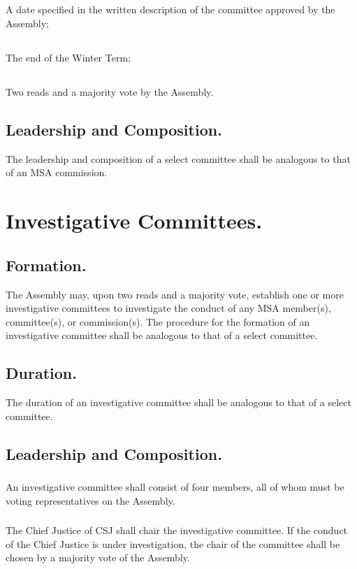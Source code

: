 \documentclass{rules}
\begin{document}
\subsection{}
A date specified in the written description of the committee approved by the Assembly;
\subsection{}
The end of the Winter Term; 
\subsection{}
Two reads and a majority vote by the Assembly.
\subsection{Leadership and Composition.}
The leadership and composition of a select committee shall be analogous to that of an MSA commission.  

\section{Investigative Committees.}
\subsection{Formation.}
The Assembly may, upon two reads and a majority vote, establish one or more investigative committees to investigate the conduct of any MSA member(s), committee(s), or commission(s).  The procedure for the formation of an investigative committee shall be analogous to that of a select committee.
\subsection{Duration.}
The duration of an investigative committee shall be analogous to that of a select committee.
\subsection{Leadership and Composition.}
\subsubsection{}
An investigative committee shall consist of four members, all of whom must be voting representatives on the Assembly.  
\subsubsection{}
The Chief Justice of CSJ shall chair the investigative committee.  If the conduct of the Chief Justice is under investigation, the chair of the committee shall be chosen by a majority vote of the Assembly.
\end{document}
